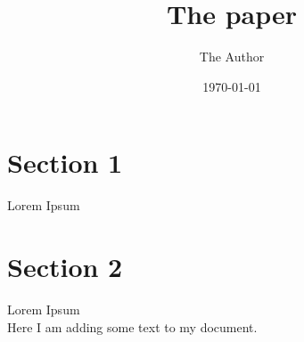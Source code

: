 \documentclass[11pt]{article}
\title{The paper}
\author{ The Author }
\date{\today}
\begin{document}
\maketitle
\pagebreak



\section{Section 1}

Lorem Ipsum


\pagebreak

\section{Section 2}

Lorem Ipsum \\

Here I am adding some text to my document.

\end{document}
